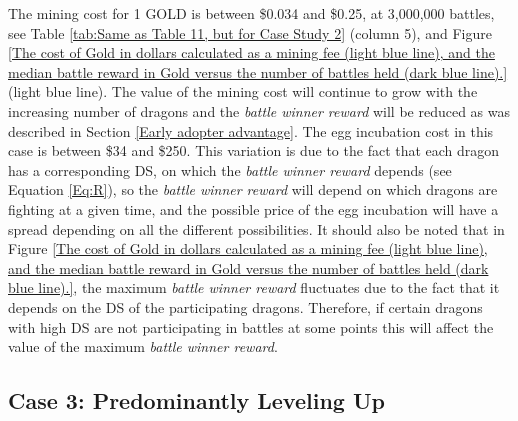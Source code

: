 \documentclass[12pt]{article}
\begin{document}
{The mining cost for 1 GOLD is between \$0.034 and \$0.25, at 3,000,000 battles, see Table \ref{tab:Same as Table 11, but for Case Study 2} (column 5), and Figure \ref{The cost of Gold in dollars calculated as a mining fee (light blue line), and the median battle reward in Gold versus the number of battles held (dark blue line).} (light blue line). The value of the mining cost will continue to grow with the increasing number of dragons and the \textit{battle winner reward} will be reduced as was described in Section \ref{Early adopter advantage}.  The egg incubation cost in this case is between \$34 and \$250. This variation is due to the fact that each dragon has a corresponding DS, on which the {\it battle winner reward} depends (see Equation \ref{Eq:R}), so the {\it battle winner reward} will depend on which dragons are fighting at a given time, and the possible price of the egg incubation will have a spread depending on all the different possibilities. It should also be noted that in Figure \ref{The cost of Gold in dollars calculated as a mining fee (light blue line), and the median battle reward in Gold versus the number of battles held (dark blue line).}, the maximum {\it battle winner reward} fluctuates due to the fact that it depends on the DS of the participating dragons. Therefore, if certain dragons with high DS are not participating in battles at some points this will affect the value of the maximum {\it battle winner reward}.\par


\subsection{Case 3: Predominantly Leveling Up}
\label{Case 3: Predominantly Leveling Up} \par




}
\end{document}
